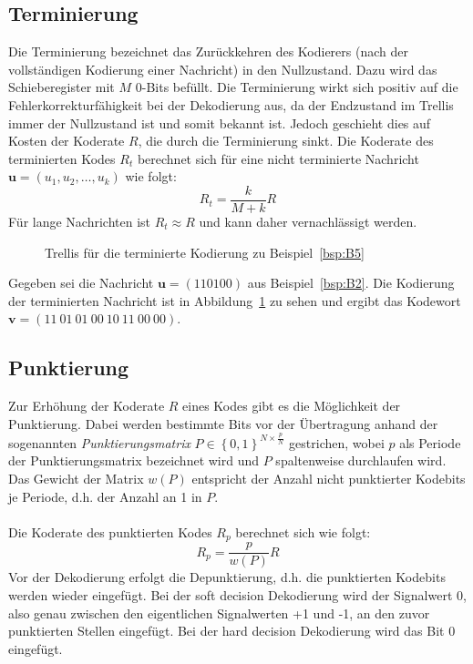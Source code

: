\subsection{Terminierung}
\label{kapitel:grundlageen_terminierung}
Die Terminierung bezeichnet das Zurückkehren des Kodierers (nach der vollständigen Kodierung einer Nachricht) in den Nullzustand. Dazu wird das Schieberegister mit $M$ 0-Bits befüllt. Die Terminierung wirkt sich positiv auf die Fehlerkorrekturfähigkeit bei der Dekodierung aus, da der Endzustand im Trellis immer der Nullzustand ist und somit bekannt ist. Jedoch geschieht dies auf Kosten der Koderate $R$, die durch die Terminierung sinkt. Die Koderate des terminierten Kodes $R_{t}$ berechnet sich für eine nicht terminierte Nachricht $\mathbf{u}=\left( u_{1},u_{2},\dots ,u_{k}\right)$ wie folgt:
\begin{equation}
R_{t}=\frac{k}{M+k}R
\end{equation}
Für lange Nachrichten ist $R_{t}\approx R$ und kann daher vernachlässigt werden.
\begin{figure}[t]

\caption{Trellis für die terminierte Kodierung zu Beispiel~\ref{bsp:B5}}
\label{abb:trellis_terminiert}
\end{figure}
\begin{beispiel}
Gegeben sei die Nachricht $\mathbf{u}=\left( 110100\right)$ aus Beispiel~\ref{bsp:B2}. Die Kodierung der terminierten Nachricht ist in Abbildung~\ref{abb:trellis_terminiert} zu sehen und ergibt das Kodewort $\mathbf{v}=\left( 11~01~01~00~10~11~00~00\right)$.
\label{bsp:B5}
\end{beispiel}

\subsection{Punktierung}
\label{kapitel:grundlagen_punktierung}
Zur Erhöhung der Koderate $R$ eines Kodes gibt es die Möglichkeit der Punktierung. Dabei werden bestimmte Bits vor der Übertragung anhand der sogenannten \emph{Punktierungsmatrix} $P \in {\left\lbrace 0,1 \right\rbrace}^{N\times \frac{p}{N}}$ gestrichen, wobei $p$ als Periode der Punktierungsmatrix bezeichnet wird und $P$ spaltenweise durchlaufen wird. Das Gewicht der Matrix $w(P)$ entspricht der Anzahl nicht punktierter Kodebits je Periode, d.h. der Anzahl an 1 in $P$.~\cite[S. 218]{schonfeld2012informations}
\\
\\
Die Koderate des punktierten Kodes $R_{p}$ berechnet sich wie folgt:
\begin{equation}
R_{p}=\frac{p}{w(P)}R
\end{equation}
Vor der Dekodierung erfolgt die Depunktierung, d.h. die punktierten Kodebits werden wieder eingefügt. Bei der soft decision Dekodierung wird der Signalwert 0, also genau zwischen den eigentlichen Signalwerten +1 und -1, an den zuvor punktierten Stellen eingefügt. Bei der hard decision Dekodierung wird das Bit 0 eingefügt.

